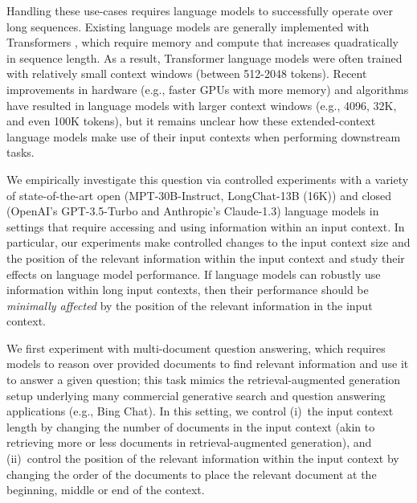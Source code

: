 \documentclass[11pt,a4paper]{article}
\newcommand{\mptinstruct}[0]{MPT-30B-Instruct\xspace}
\newcommand{\longchat}[0]{LongChat-13B (16K)\xspace}
\newcommand{\gptturbo}[0]{GPT-3.5-Turbo\xspace}
\newcommand{\claude}[0]{Claude-1.3\xspace}
\begin{document}
Handling these use-cases requires language models to successfully operate over long sequences.
Existing language models are generally implemented with Transformers \citep{10.5555/3295222.3295349}, which require memory and compute that increases quadratically in sequence length.
As a result, Transformer language models were often trained with relatively small context windows (between 512-2048 tokens).
Recent improvements in hardware (e.g., faster GPUs with more memory) and algorithms \citep[\emph{inter alia}]{dai-etal-2019-transformer,dao2022flashattention,poli2023hyena,rubin2023longrange} have resulted in language models with larger context windows (e.g., 4096, 32K, and even 100K tokens), but it remains unclear how these extended-context language models make use of their input contexts when performing downstream tasks.

We empirically investigate this question via controlled experiments with a variety of state-of-the-art open (\mptinstruct, \longchat) and closed (OpenAI's \gptturbo and Anthropic's \claude) language models in settings that require accessing and using information within an input context.
In particular, our experiments make controlled changes to the input context size and the position of the relevant information within the input context and study their effects on language model performance.
If language models can robustly use information within long input contexts, then their performance should be \emph{minimally affected} by the position of the relevant information in the input context.

We first experiment with multi-document question answering, which requires models to reason over provided documents to find relevant information and use it to answer a given question; this task mimics the retrieval-augmented generation setup underlying many commercial generative search and question answering applications (e.g., Bing Chat).
In this setting, we control (i)~the input context length by changing the number of documents in the input context (akin to retrieving more or less documents in retrieval-augmented generation), and (ii)~control the position of the relevant information within the input context by changing the order of the documents to place the relevant document at the beginning, middle or end of the context.
\end{document}
